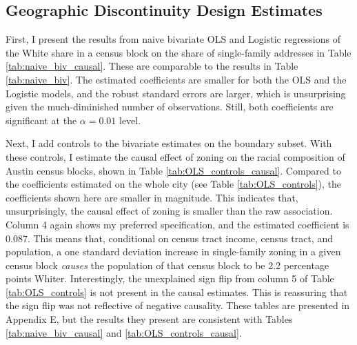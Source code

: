 \documentclass[11pt]{article}
\begin{document}
\subsection{Geographic Discontinuity Design Estimates}

First, I present the results from naive bivariate OLS and Logistic regressions of the White share in a census block on the share of single-family addresses in Table \ref{tab:naive_biv_causal}. These are comparable to the results in Table \ref{tab:naive_biv}. The estimated coefficients are smaller for both the OLS and the Logistic models, and the robust standard errors are larger, which is unsurprising given the much-diminished number of observations. Still, both coefficients are significant at the $\alpha=0.01$ level.

Next, I add controls to the bivariate estimates on the boundary subset. With these controls, I estimate the causal effect of zoning on the racial composition of Austin census blocks, shown in Table \ref{tab:OLS_controls_causal}. Compared to the coefficients estimated on the whole city (see Table \ref{tab:OLS_controls}), the coefficients shown here are smaller in magnitude. This indicates that, unsurprisingly, the causal effect of zoning is smaller than the raw association. Column 4 again shows my preferred specification, and the estimated coefficient is $0.087$. This means that, conditional on census tract income, census tract, and population, a one standard deviation increase in single-family zoning in a given census block \textit{causes} the population of that census block to be 2.2 percentage points Whiter. Interestingly, the unexplained sign flip from column 5 of Table \ref{tab:OLS_controls} is not present in the causal estimates. This is reassuring that the sign flip was not reflective of negative causality. These tables are presented in Appendix E, but the results they present are consistent with Tables \ref{tab:naive_biv_causal} and \ref{tab:OLS_controls_causal}.
\end{document}
